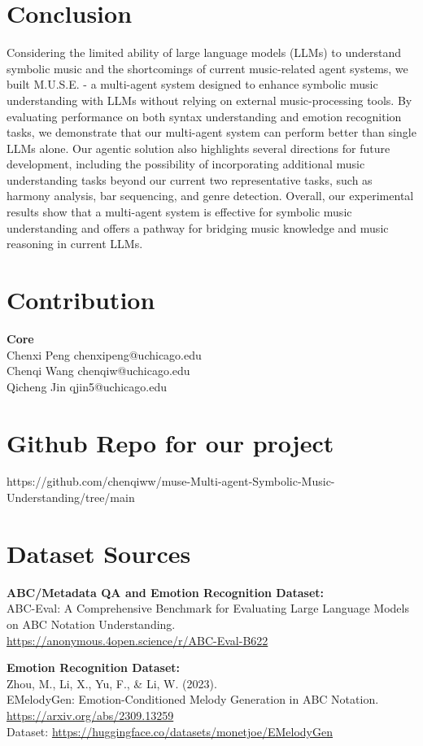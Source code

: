 \documentclass[sigconf]{acmart}
\begin{document}
\section{Conclusion}
Considering the limited ability of large language models (LLMs) to understand symbolic music and the shortcomings of current music-related agent systems, we built M.U.S.E. - a multi-agent system designed to enhance symbolic music understanding with LLMs without relying on external music-processing tools. By evaluating performance on both syntax understanding and emotion recognition tasks, we demonstrate that our multi-agent system can perform better than single LLMs alone.  Our agentic solution also highlights several directions for future development, including the possibility of incorporating additional music understanding tasks beyond our current two representative tasks, such as harmony analysis, bar sequencing, and genre detection. Overall, our experimental results show that a multi-agent system is effective for symbolic music understanding and offers a pathway for bridging music knowledge and music reasoning in current LLMs.

\section*{Contribution}
\textbf{Core}\\
Chenxi Peng chenxipeng@uchicago.edu\\
Chenqi Wang chenqiw@uchicago.edu\\
Qicheng Jin qjin5@uchicago.edu\\

\section*{Github Repo for our project}
https://github.com/chenqiww/muse-Multi-agent-Symbolic-Music-Understanding/tree/main

\section*{Dataset Sources}

\noindent\textbf{ABC/Metadata QA and Emotion Recognition Dataset:}\\
ABC-Eval: A Comprehensive Benchmark for Evaluating Large Language Models
on ABC Notation Understanding.\\
\url{https://anonymous.4open.science/r/ABC-Eval-B622}

\medskip

\noindent\textbf{Emotion Recognition Dataset:}\\
Zhou, M., Li, X., Yu, F., \& Li, W. (2023).\\
EMelodyGen: Emotion-Conditioned Melody Generation in ABC Notation.\\
\url{https://arxiv.org/abs/2309.13259}\\
Dataset: \url{https://huggingface.co/datasets/monetjoe/EMelodyGen}



\end{document}
